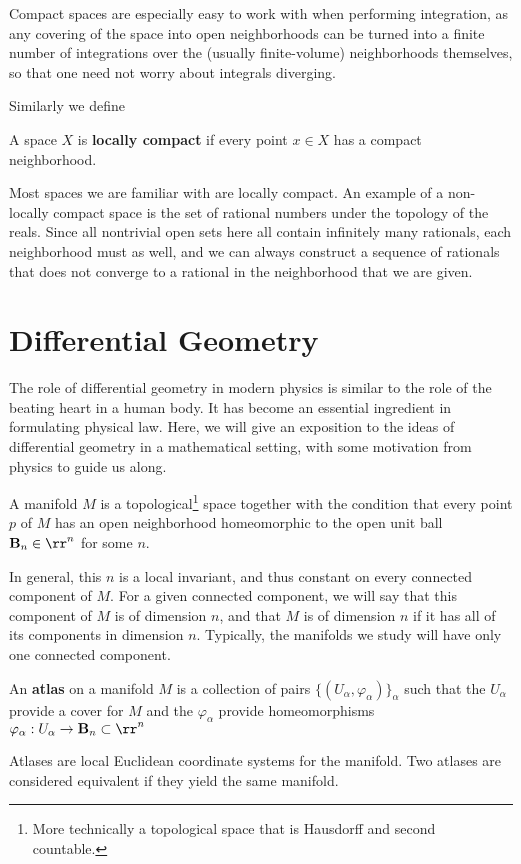 	Compact spaces are especially easy to work with when performing integration, as any covering of the space into open neighborhoods can be turned into a finite number of integrations over the (usually finite-volume) neighborhoods themselves, so that one need not worry about integrals diverging. 
	
	Similarly we define
	\begin{defn}
		A space $X$ is \textbf{locally compact} if every point $x \in X$ has a compact neighborhood.
	\end{defn}
	
	Most spaces we are familiar with are locally compact. An example of a non-locally compact space is the set of rational numbers under the topology of the reals. Since all nontrivial open sets here all contain infinitely many rationals, each neighborhood must as well, and we can always construct a sequence of rationals that does not converge to a rational in the neighborhood that we are given. 
	
	
	
	\section{Differential Geometry} %
	\label{sec:differential_geometry}
	
	The role of differential geometry in modern physics is similar to the role of the beating heart in a human body. It has become an essential ingredient in formulating physical law. Here, we will give an exposition to the ideas of differential geometry in a mathematical setting, with some motivation from physics to guide us along.
	
	\begin{defn}[Manifold]
		A manifold $M$ is a topological\footnote{More technically a topological space that is Hausdorff and second countable.} space together with the condition that every point $p$ of $M$ has an open neighborhood homeomorphic to the open unit ball $\mathbf B_n \in \rr^n$ for some $n$.
	\end{defn}
	In general, this $n$ is a local invariant, and thus constant on every connected component of $M$. For a given connected component, we will say that this component of $M$ is of dimension $n$, and that $M$ is of dimension $n$ if it has all of its components in dimension $n$. Typically, the manifolds we study will have only one connected component.
	
	
	\begin{defn}[Atlas]
		An \textbf{atlas} on a manifold $M$ is a collection of pairs $\{(U_\alpha, \varphi_{\alpha})\}_{\alpha}$ such that the $U_\alpha$ provide a cover for $M$ and the $\varphi_\alpha$ provide homeomorphisms $\varphi_\alpha: U_\alpha \to \mathbf B_n \subset \rr^n$
	\end{defn}
	Atlases are local Euclidean coordinate systems for the manifold.
	Two atlases are considered equivalent if they yield the same manifold. 
	
